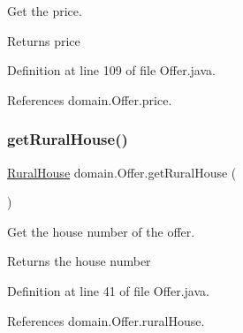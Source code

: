 Get the price. 

\begin{DoxyReturn}{Returns}
price 
\end{DoxyReturn}


Definition at line 109 of file Offer.\+java.


\begin{DoxyCode}{0}

\end{DoxyCode}


References domain.\+Offer.\+price.

\mbox{\label{classdomain_1_1Offer_a3804f5f9ad3a3bf380e55389ccfa9dba}} 
\subsubsection{\texorpdfstring{getRuralHouse()}{getRuralHouse()}}
{\footnotesize\ttfamily \mbox{\hyperlink{classdomain_1_1RuralHouse}{Rural\+House}} domain.\+Offer.\+get\+Rural\+House (\begin{DoxyParamCaption}{ }\end{DoxyParamCaption})}



Get the house number of the offer. 

\begin{DoxyReturn}{Returns}
the house number 
\end{DoxyReturn}


Definition at line 41 of file Offer.\+java.


\begin{DoxyCode}{0}

\end{DoxyCode}


References domain.\+Offer.\+rural\+House.

\mbox{\label{classdomain_1_1Offer_a35ebc81c0ebfe427d7bb68abaf811852}} 
